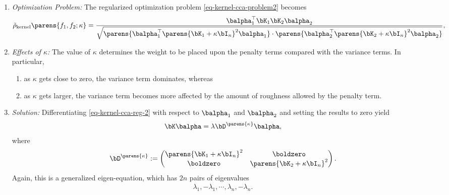 \documentclass[12pt]{article}
\begin{document}
\begin{enumerate}[label=\textbf{\arabic*.}]
\begin{enumerate}
		\item \textit{Optimization Problem:} The regularized optimization problem \eqref{eq-kernel-cca-problem2} becomes 
		\begin{align}\label{eq-kernel-cca-reg-2}
			\tilde{\rho}_{\mathrm{kernel}} \parens{f_1, f_2; \kappa} = \frac{\balpha_1^\top \bK_1 \bK_2 \balpha_2}{\sqrt{\parens{\balpha_1^\top \parens{\bK_1 + \kappa \bI_n}^2 \balpha_1} \cdot \parens{\balpha_2^\top \parens{\bK_2 + \kappa \bI_n}^2 \balpha_2}}}, 
		\end{align}
		
		\item \textit{Effects of $\kappa$:} The value of $\kappa$ determines the weight to be placed upon the penalty terms compared with the variance terms. In particular, 
		\begin{enumerate}
			\item as $\kappa$ gets close to zero, the variance term dominates, whereas 
			\item as $\kappa$ gets larger, the variance term becomes more affected by the amount of roughness allowed by the penalty term. 
		\end{enumerate}
		
		\item \textit{Solution:} Differentiating \eqref{eq-kernel-cca-reg-2} with respect to $\balpha_1$ and $\balpha_2$ and setting the results to zero yield 
		\begin{align}\label{eq-kernelcca-gen-eigen}
			\bK \balpha = \lambda \bD^{\parens{\kappa}} \balpha, 
		\end{align}
		where 
		\begin{align*}
			\bD^{\parens{\kappa}} := \begin{pmatrix}
				\parens{\bK_1 + \kappa \bI_n}^2 & \boldzero \\ 
				\boldzero & \parens{\bK_2 + \kappa \bI_n}^2
			\end{pmatrix}. 
		\end{align*}
		Again, this is a generalized eigen-equation, which has $2n$ pairs of eigenvalues 
		\begin{align*}
			\lambda_1, -\lambda_1, \cdots, \lambda_n, - \lambda_n. 
		\end{align*}
		

\end{enumerate}
\end{enumerate}
\end{document}
